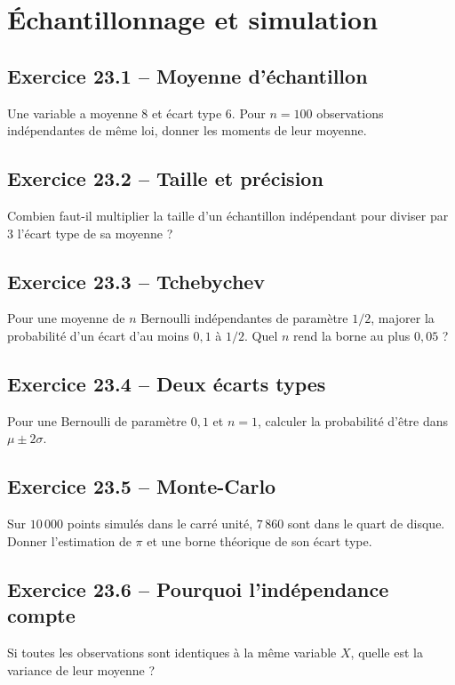 \chapter{Échantillonnage et simulation}
\section*{Exercice 23.1 -- Moyenne d'échantillon}
Une variable a moyenne $8$ et écart type $6$. Pour $n=100$ observations indépendantes de même loi, donner les moments de leur moyenne.

\section*{Exercice 23.2 -- Taille et précision}
Combien faut-il multiplier la taille d'un échantillon indépendant pour diviser par $3$ l'écart type de sa moyenne ?

\section*{Exercice 23.3 -- Tchebychev}
Pour une moyenne de $n$ Bernoulli indépendantes de paramètre $1/2$, majorer la probabilité d'un écart d'au moins $0{,}1$ à $1/2$. Quel $n$ rend la borne au plus $0{,}05$ ?

\section*{Exercice 23.4 -- Deux écarts types}
Pour une Bernoulli de paramètre $0{,}1$ et $n=1$, calculer la probabilité d'être dans $\mu\pm2\sigma$.

\section*{Exercice 23.5 -- Monte-Carlo}
Sur $10\,000$ points simulés dans le carré unité, $7\,860$ sont dans le quart de disque. Donner l'estimation de $\pi$ et une borne théorique de son écart type.

\section*{Exercice 23.6 -- Pourquoi l'indépendance compte}
Si toutes les observations sont identiques à la même variable $X$, quelle est la variance de leur moyenne ?

